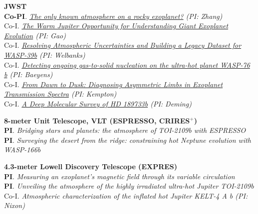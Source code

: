 \documentclass[letterpaper,11pt]{article}
\begin{document}
\small
  \begin{list}{}{\cvlist}  

  
  
  \item[{\color{numcolor}}]\textbf{JWST} \\
\textbf{Co-PI}. \textit{\href{https://www.stsci.edu/jwst/science-execution/program-information?id=7875}{The only known atmosphere on a rocky exoplanet?} (PI: Zhang)} \\
Co-I. \textit{\href{https://www.stsci.edu/jwst/science-execution/program-information?id=9025}{The Warm Jupiter Opportunity for Understanding Giant Exoplanet Evolution} (PI: Gao)} \\
Co-I. \textit{\href{https://www.stsci.edu/jwst/science-execution/program-information?id=8017}{Resolving Atmospheric Uncertainties and Building a Legacy Dataset for WASP-39b} (PI: Welbanks)} \\
  Co-I. \textit{\href{https://www.stsci.edu/jwst/science-execution/program-information?id=6045}{Detecting ongoing gas-to-solid nucleation on the ultra-hot planet WASP-76 b} (PI: Baeyens)} \\
  Co-I. \textit{\href{https://www.stsci.edu/jwst/science-execution/program-information?id=5275}{From Dawn to Dusk: Diagnosing Asymmetric Limbs in Exoplanet Transmission Spectra} (PI: Kempton)} \\ 
  Co-I. \textit{\href{https://www.stsci.edu/jwst/science-execution/program-information?id=1633}{A Deep Molecular Survey of HD 189733b} (PI: Deming)}

  \item[{\color{numcolor}}]\textbf{8-meter Unit Telescope, VLT (ESPRESSO, CRIRES$^+$)} \\
\textbf{PI}. \textit{Bridging stars and planets: the atmosphere of TOI-2109b with ESPRESSO} \\
\textbf{PI}. \textit{Surveying the desert from the ridge: constraining hot Neptune evolution with WASP-166b} \\

  \item[{\color{numcolor}}]\textbf{4.3-meter Lowell Discovery Telescope (EXPRES)} \\
      \textbf{PI}. \textit{Measuring an exoplanet’s magnetic field through its variable circulation}\\
     \textbf{PI}. \textit{Unveiling the atmosphere of the highly irradiated ultra-hot Jupiter TOI-2109b}\\
     Co-I. \textit{Atmospheric characterization of the inflated hot Jupiter KELT-4 A b (PI: Nixon)}


\end{list}
\end{document}
